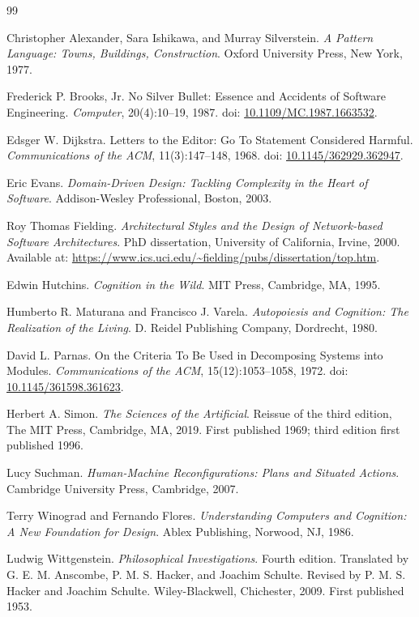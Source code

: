 \documentclass[11pt]{article}
\begin{document}
\begin{thebibliography}{99}

Christopher Alexander, Sara Ishikawa, and Murray Silverstein.
\newblock \emph{A Pattern Language: Towns, Buildings, Construction}.
\newblock Oxford University Press, New York, 1977.

Frederick P. Brooks, Jr.
\newblock No Silver Bullet: Essence and Accidents of Software Engineering.
\newblock \emph{Computer}, 20(4):10--19, 1987.
\newblock doi: \href{https://doi.org/10.1109/MC.1987.1663532}{10.1109/MC.1987.1663532}.

Edsger W. Dijkstra.
\newblock Letters to the Editor: Go To Statement Considered Harmful.
\newblock \emph{Communications of the ACM}, 11(3):147--148, 1968.
\newblock doi: \href{https://doi.org/10.1145/362929.362947}{10.1145/362929.362947}.

Eric Evans.
\newblock \emph{Domain-Driven Design: Tackling Complexity in the Heart of Software}.
\newblock Addison-Wesley Professional, Boston, 2003.

Roy Thomas Fielding.
\newblock \emph{Architectural Styles and the Design of Network-based Software Architectures}.
\newblock PhD dissertation, University of California, Irvine, 2000.
\newblock Available at: \url{https://www.ics.uci.edu/~fielding/pubs/dissertation/top.htm}.

Edwin Hutchins.
\newblock \emph{Cognition in the Wild}.
\newblock MIT Press, Cambridge, MA, 1995.

Humberto R. Maturana and Francisco J. Varela.
\newblock \emph{Autopoiesis and Cognition: The Realization of the Living}.
\newblock D. Reidel Publishing Company, Dordrecht, 1980.

David L. Parnas.
\newblock On the Criteria To Be Used in Decomposing Systems into Modules.
\newblock \emph{Communications of the ACM}, 15(12):1053--1058, 1972.
\newblock doi: \href{https://doi.org/10.1145/361598.361623}{10.1145/361598.361623}.

Herbert A. Simon.
\newblock \emph{The Sciences of the Artificial}.
\newblock Reissue of the third edition, The MIT Press, Cambridge, MA, 2019.
\newblock First published 1969; third edition first published 1996.

Lucy Suchman.
\newblock \emph{Human-Machine Reconfigurations: Plans and Situated Actions}.
\newblock Cambridge University Press, Cambridge, 2007.

Terry Winograd and Fernando Flores.
\newblock \emph{Understanding Computers and Cognition: A New Foundation for Design}.
\newblock Ablex Publishing, Norwood, NJ, 1986.

Ludwig Wittgenstein.
\newblock \emph{Philosophical Investigations}.
\newblock Fourth edition. Translated by G. E. M. Anscombe, P. M. S. Hacker, and Joachim Schulte. Revised by P. M. S. Hacker and Joachim Schulte.
\newblock Wiley-Blackwell, Chichester, 2009.
\newblock First published 1953.

\end{thebibliography}
\end{document}
